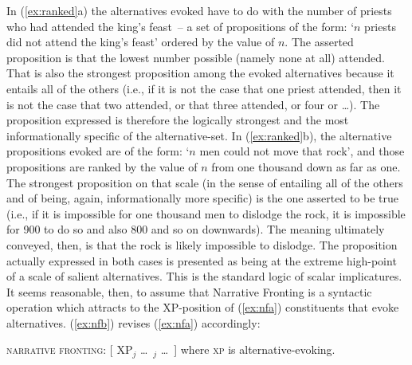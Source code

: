 \documentclass[output=paper,colorlinks,citecolor=brown]{langscibook}
\begin{document}

\noindent In (\ref{ex:ranked}a) the alternatives evoked have to do with the number of priests who had attended the king's feast~-- a set of propositions of the form: `$n$ priests did not attend the king's feast' ordered by the value of $n$.  The asserted proposition is that the lowest number possible (namely none at all) attended. That is also the strongest proposition among the evoked alternatives because it entails all of the others (i.e., if it is not the case that one priest attended, then it is not the case that two attended, or that three attended, or four or \ldots{}).  The proposition expressed is therefore the logically strongest and the most informationally specific of the alternative-set.  In (\ref{ex:ranked}b), the alternative propositions evoked are of the form: `$n$ men could not move that rock', and those propositions are ranked by the value of $n$ from one thousand down as far as one. The strongest proposition on that scale (in the sense of entailing all of the others and of being, again, informationally more specific) is the one asserted to be true (i.e., if it is impossible for one thousand men to dislodge the rock, it is impossible for 900 to do so and also 800 and so on downwards).  The meaning ultimately conveyed, then, is that the rock is likely impossible to dislodge. The proposition actually expressed in both cases is presented as being at the extreme high-point of a scale of salient alternatives. This is the standard logic of scalar implicatures. It seems reasonable, then, to assume that Narrative Fronting is a syntactic operation which attracts to the XP-position of (\ref{ex:nfa}) constituents that evoke alternatives. (\ref{ex:nfb}) revises (\ref{ex:nfa})  accordingly: 

\ea\label{ex:nfb}\textsc{narrative fronting}:
\ea $[$ XP$_j$   \ldots\ \gapline$_j$ \ldots\ ]
\ex where \textsc{xp} is alternative-evoking.
\z
\z
\end{document}
